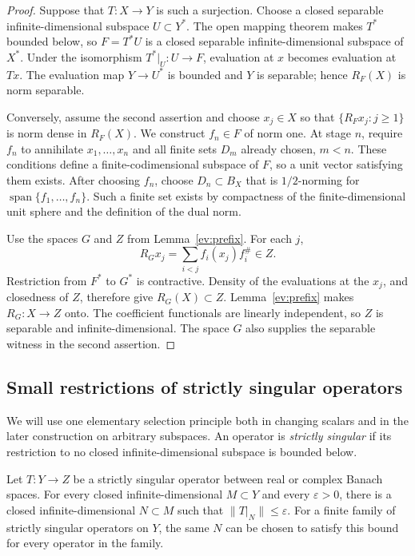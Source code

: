 \begin{proof}
Suppose that $T:X\to Y$ is such a surjection.  Choose a closed separable
infinite-dimensional subspace $U\subset Y^*$.  The open mapping theorem
makes $T^*$ bounded below, so $F=T^*U$ is a closed separable
infinite-dimensional subspace of $X^*$.  Under the isomorphism
$T^*|_U:U\to F$, evaluation at $x$ becomes evaluation at $Tx$.
The evaluation map $Y\to U^*$ is bounded and $Y$ is separable; hence
$R_F(X)$ is norm separable.

Conversely, assume the second assertion and choose $x_j\in X$ so that
$\{R_Fx_j:j\ge1\}$ is norm dense in $R_F(X)$.
We construct $f_n\in F$ of norm one.  At stage $n$, require $f_n$ to
annihilate $x_1,\ldots,x_n$ and all finite sets $D_m$ already chosen,
$m<n$.  These conditions define a finite-codimensional subspace of $F$,
so a unit vector satisfying them exists.  After choosing $f_n$, choose
$D_n\subset B_X$ that is $1/2$-norming for
$\operatorname{span}\{f_1,\ldots,f_n\}$.  Such a finite set exists by
compactness of the finite-dimensional unit sphere and the definition of
the dual norm.

Use the spaces $G$ and $Z$ from Lemma~\ref{ev:prefix}.  For each $j$,
\[
 R_Gx_j=\sum_{i<j}f_i(x_j)f_i^\#\in Z.
\]
Restriction from $F^*$ to $G^*$ is contractive.  Density of the evaluations
at the $x_j$, and closedness of $Z$, therefore give $R_G(X)\subset Z$.
Lemma~\ref{ev:prefix} makes $R_G:X\to Z$ onto.  The coefficient
functionals are linearly independent, so $Z$ is separable and
infinite-dimensional.  The space $G$ also supplies the separable witness
in the second assertion.
\end{proof}

\subsection{Small restrictions of strictly singular operators}

We will use one elementary selection principle both in changing scalars
and in the later construction on arbitrary subspaces.  An operator is
\emph{strictly singular} if its restriction to no closed
infinite-dimensional subspace is bounded below.

\begin{lemma}\label{ev:small}
Let $T:Y\to Z$ be a strictly singular operator between real or complex
Banach spaces.  For every closed infinite-dimensional $M\subset Y$ and
every $\varepsilon>0$, there is a closed infinite-dimensional
$N\subset M$ such that $\|T|_N\|\le\varepsilon$.
For a finite family of strictly singular operators on $Y$, the same $N$
can be chosen to satisfy this bound for every operator in the family.
\end{lemma}

